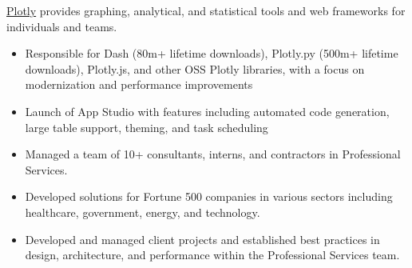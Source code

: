 \documentclass[10pt,ragged2e]{altacv}
\begin{document}
\tagline{}

\begin{fullwidth}
\makecvheader
\end{fullwidth}


\href{https://plotly.com}{Plotly} provides graphing, analytical, and statistical tools and web frameworks for individuals and teams.
\\[8pt]

\begin{itemize}
\item Responsible for Dash (80m+ lifetime downloads), Plotly.py (500m+ lifetime downloads), Plotly.js, and other OSS Plotly libraries, with a focus on modernization and performance improvements
\item Launch of App Studio with features including automated code generation, large table support, theming, and task scheduling\end{itemize}

\divider

\begin{itemize}
\item Managed a team of 10+ consultants, interns, and contractors in Professional Services.
\item Developed solutions for Fortune 500 companies in various sectors including healthcare, government, energy, and technology.
\end{itemize}

\divider

\begin{itemize}
\item Developed and managed client projects and established best practices in design, architecture, and performance within the Professional Services team.
\end{itemize}
\end{document}
